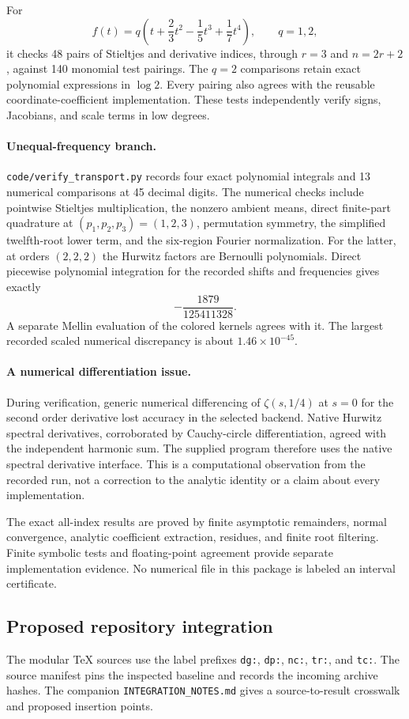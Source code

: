 \documentclass[11pt,a4paper]{article}
\numberwithin{equation}{section}
\theoremstyle{definition}
\theoremstyle{remark}
\newcommand{\src}[1]{\nolinkurl{#1}}
\begin{document}
For
\[
 f(t)=q\left(t+\frac23t^2-\frac15t^3+\frac17t^4\right),
 \qquad q=1,2,
\]
it checks 48 pairs of Stieltjes and derivative indices, through
$r=3$ and $n=2r+2$, against 140 monomial test pairings.
The $q=2$ comparisons retain exact polynomial expressions in
$\log2$. Every pairing also agrees with the reusable
coordinate-coefficient implementation. These tests independently
verify signs, Jacobians, and scale terms in low degrees.

\paragraph{Unequal-frequency branch.}
\src{code/verify_transport.py} records four exact polynomial
integrals and 13 numerical comparisons at 45 decimal digits.
The numerical checks include pointwise Stieltjes multiplication,
the nonzero ambient means, direct finite-part quadrature at
$(p_1,p_2,p_3)=(1,2,3)$, permutation symmetry, the simplified
twelfth-root lower term, and the six-region Fourier normalization.
For the latter, at orders $(2,2,2)$ the Hurwitz factors are
Bernoulli polynomials. Direct piecewise polynomial integration
for the recorded shifts and frequencies gives exactly
\[
 -\frac{1879}{125411328}.
\]
A separate Mellin evaluation of the colored kernels agrees with it.
The largest recorded scaled numerical discrepancy is about
$1.46\times10^{-45}$.

\paragraph{A numerical differentiation issue.}
During verification, generic numerical differencing of
$\zeta(s,1/4)$ at $s=0$ for the second order derivative lost
accuracy in the selected backend. Native Hurwitz spectral
derivatives, corroborated by Cauchy-circle differentiation, agreed
with the independent harmonic sum. The supplied program therefore
uses the native spectral derivative interface. This is a
computational observation from the recorded run, not a correction
to the analytic identity or a claim about every implementation.

The exact all-index results are proved by finite asymptotic
remainders, normal convergence, analytic coefficient extraction,
residues, and finite root filtering. Finite symbolic tests and
floating-point agreement provide separate implementation evidence.
No numerical file in this package is labeled an interval certificate.

\subsection{Proposed repository integration}
The modular TeX sources use the label prefixes \src{dg:},
\src{dp:}, \src{nc:}, \src{tr:}, and \src{tc:}. The source manifest
pins the inspected baseline and records the incoming archive hashes.
The companion \src{INTEGRATION_NOTES.md} gives a source-to-result
crosswalk and proposed insertion points.
\end{document}
